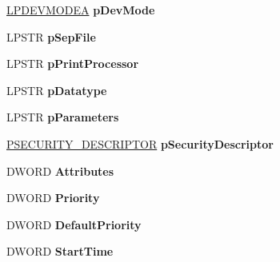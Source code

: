 \begin{DoxyCompactItemize}
\hyperlink{struct__devicemode_a}{L\+P\+D\+E\+V\+M\+O\+D\+EA} {\bfseries p\+Dev\+Mode}
\item 
\mbox{\label{struct___p_r_i_n_t_e_r___i_n_f_o__2_a_a7767686e2f07d3d614009f795c99e785}} 
L\+P\+S\+TR {\bfseries p\+Sep\+File}
\item 
\mbox{\label{struct___p_r_i_n_t_e_r___i_n_f_o__2_a_af5fb24f1254ba17905e3a9da060e9151}} 
L\+P\+S\+TR {\bfseries p\+Print\+Processor}
\item 
\mbox{\label{struct___p_r_i_n_t_e_r___i_n_f_o__2_a_a202275dde2e5bae7c199db0d837a5a26}} 
L\+P\+S\+TR {\bfseries p\+Datatype}
\item 
\mbox{\label{struct___p_r_i_n_t_e_r___i_n_f_o__2_a_a18f0b1399f937aee80fbb4af5b649007}} 
L\+P\+S\+TR {\bfseries p\+Parameters}
\item 
\mbox{\label{struct___p_r_i_n_t_e_r___i_n_f_o__2_a_a543770a48595303b2a7784268bfa1c99}} 
\hyperlink{struct___s_e_c_u_r_i_t_y___d_e_s_c_r_i_p_t_o_r}{P\+S\+E\+C\+U\+R\+I\+T\+Y\+\_\+\+D\+E\+S\+C\+R\+I\+P\+T\+OR} {\bfseries p\+Security\+Descriptor}
\item 
\mbox{\label{struct___p_r_i_n_t_e_r___i_n_f_o__2_a_a90e1e97ed3a069a8d4e6b7547e837aeb}} 
D\+W\+O\+RD {\bfseries Attributes}
\item 
\mbox{\label{struct___p_r_i_n_t_e_r___i_n_f_o__2_a_a0ac9153a33e954ddfc61ba1fdfaa28cd}} 
D\+W\+O\+RD {\bfseries Priority}
\item 
\mbox{\label{struct___p_r_i_n_t_e_r___i_n_f_o__2_a_a2090e34c24c50845f65791f374b7e94b}} 
D\+W\+O\+RD {\bfseries Default\+Priority}
\item 
\mbox{\label{struct___p_r_i_n_t_e_r___i_n_f_o__2_a_a70f078c1757231928a67b28068ea5562}} 
D\+W\+O\+RD {\bfseries Start\+Time}
\item 
\mbox{\label{struct___p_r_i_n_t_e_r___i_n_f_o__2_a_a802dfedb76bb039681549199e6567f34}} 

\end{DoxyCompactItemize}
